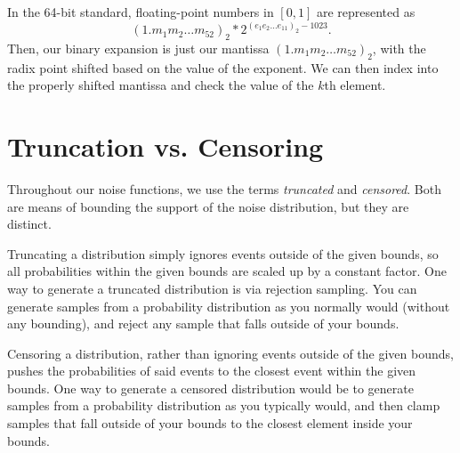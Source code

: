 \documentclass[11pt]{scrartcl} %
\begin{document}
In the 64-bit standard, floating-point numbers in $[0,1]$ are represented as
\[ (1.m_1m_2 \hdots m_{52})_2 * 2^{(e_{1}e_2 \hdots e_{11})_2 - 1023}. \]
Then, our binary expansion is just our mantissa $(1.m_1m_2 \hdots m_{52})_2$, with
the radix point shifted based on the value of the exponent.
We can then index into the properly shifted mantissa and check the value of the $k$th element.


\section{Truncation vs. Censoring}
Throughout our noise functions, we use the terms \emph{truncated} and \emph{censored}.
Both are means of bounding the support of the noise distribution, but they are distinct. \newline

Truncating a distribution simply ignores events outside of the given bounds, so
all probabilities within the given bounds are scaled up by a constant factor.
One way to generate a truncated distribution is via rejection sampling.
You can generate samples from a probability distribution as you normally would (without any bounding),
and reject any sample that falls outside of your bounds. \newline

Censoring a distribution, rather than ignoring events outside of the given bounds, pushes the
probabilities of said events to the closest event within the given bounds. One way to generate
a censored distribution would be to generate samples from a probability distribution as you
typically would, and then clamp samples that fall outside of your bounds to the closest element
inside your bounds.





\end{document}
